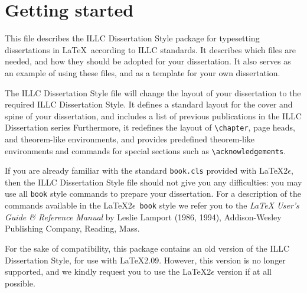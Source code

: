 
\chapter{Getting started}

This file describes the ILLC Dissertation Style package for
typesetting dissertations in \LaTeX\ according to ILLC standards.
It describes which files are needed, and how they should be adopted
for your dissertation.
It also serves as an example of using these files, and as a template
for your own dissertation.

The ILLC Dissertation Style file will change the
layout of your dissertation to the required ILLC Dissertation Style.
It defines a standard layout for the cover and spine of your dissertation,
and includes a list of previous publications in the ILLC Dissertation series
Furthermore, it redefines the layout of \verb|\chapter|, page heads,
and theorem-like environments,
and provides predefined theorem-like environments and
commands for special sections such as \verb|\acknowledgements|.

If you are already familiar with the standard {\tt book.cls} provided with
\LaTeX 2$\epsilon$, then the ILLC Dissertation Style file should not give you
any difficulties: you may use all {\tt book} style commands to prepare 
your dissertation.
For a description of the commands available in the \LaTeX 2$\epsilon$\ 
{\tt book} style we refer you to the {\em \LaTeX{} User's Guide \& Reference
Manual\/} by Leslie Lamport (1986, 1994), Addison-Wesley Publishing
Company, Reading, Mass.

For the sake of compatibility, this package contains an old version of the
ILLC Dissertation Style, for use with \LaTeX 2.09. However, this version
is no longer supported, and we kindly request you to use the
\LaTeX 2$\epsilon$ version if at all possible.


